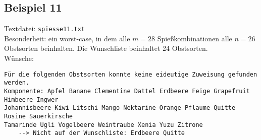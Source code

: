 \subsection{Beispiel 11}\label{example:11}
Textdatei: \texttt{spiesse11.txt}\\
Besonderheit: ein worst-case, in dem alle $m = 28$ Spießkombinationen alle $n = 26$ Obstsorten beinhalten. Die Wunschliste beinhaltet 24 Obstsorten.\\

\noindent
Wünsche: \\
\vspace{7pt}

\noindent
{}
\begin{verbatim}
Für die folgenden Obstsorten konnte keine eideutige Zuweisung gefunden werden.
Komponente: Apfel Banane Clementine Dattel Erdbeere Feige Grapefruit Himbeere Ingwer
Johannisbeere Kiwi Litschi Mango Nektarine Orange Pflaume Quitte Rosine Sauerkirsche
Tamarinde Ugli Vogelbeere Weintraube Xenia Yuzu Zitrone 
	--> Nicht auf der Wunschliste: Erdbeere Quitte
\end{verbatim}
